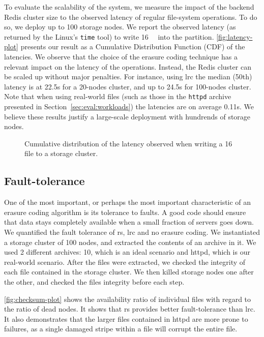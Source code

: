 To evaluate the scalability of the system, we measure the impact of the backend Redis cluster size to the observed latency of regular file-system operations.
To do so, we deploy up to 100 storage nodes.
We report the observed latency (as returned by the Linux's \texttt{time} tool) to write \SI{16}{\mebi\byte} into the \SYS partition.
\autoref{fig:latency-plot} presents our result as a Cumulative Distribution Function (CDF) of the latencies.
We observe that the choice of the erasure coding technique has a relevant impact on the latency of the operations. 
Instead, the Redis cluster can be scaled up without major penalties.
For instance, using \ac{lrc} the median (50th) latency is at 22.5s for a 20-nodes cluster, and up to 24.5s for 100-nodes cluster. 
Note that when using real-world files (such as those in the \texttt{httpd} archive presented in Section~\ref{sec:eval:workloads}) the latencies are on average 0.11s. 
We believe these results justify a large-scale deployment with hundrends of storage nodes. 

\begin{figure}[th]
    \centering
    
    \caption{Cumulative distribution of the latency observed when writing a \SI{16}{\mebi\byte} file to a storage cluster.}
    \label{fig:latency-plot}
\end{figure}

\subsection{Fault-tolerance}
\label{subsec:fault-tolerance}

One of the most important, or perhaps the most important characteristic of an erasure coding algorithm is its tolerance to faults.
A good code should ensure that data stays completely available when a small fraction of servers goes down.
We quantified the fault tolerance of \acf{rs}, \acf{lrc} and no erasure coding.
We instantiated a storage cluster of 100 nodes, and extracted the contents of an archive in it.
We used 2 different archives: \SI{10}{\byte}, which is an ideal scenario and httpd, which is our real-world scenario.
After the files were extracted, we checked the integrity of each file contained in the storage cluster.
We then killed storage nodes one after the other, and checked the files integrity before each step.

\autoref{fig:checksum-plot} shows the availability ratio of individual files with regard to the ratio of dead nodes.
It shows that \ac{rs} provides better fault-tolerance than \ac{lrc}.
It also demonstrates that the larger files contained in httpd are more prone to failures, as a single damaged stripe within a file will corrupt the entire file.

